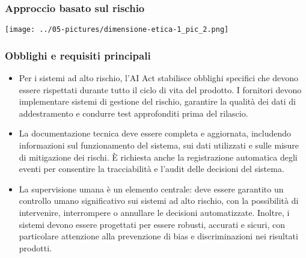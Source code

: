 \documentclass{beamer}
\begin{document}
%
%
\begin{frame}
\frametitle{Approccio basato sul rischio}
\begin{center}
\texttt{[image: ../05-pictures/dimensione-etica-1\_pic\_2.png]} 
\end{center}
\end{frame}
%
%
\begin{frame}
\frametitle{Obblighi e requisiti principali}
\begin{itemize}
\small
\item Per i sistemi ad alto rischio, l'AI Act stabilisce obblighi specifici che devono essere rispettati durante tutto il ciclo di vita del prodotto. I fornitori devono implementare sistemi di gestione del rischio, garantire la qualità dei dati di addestramento e condurre test approfonditi prima del rilascio.

\item La documentazione tecnica deve essere completa e aggiornata, includendo informazioni sul funzionamento del sistema, sui dati utilizzati e sulle misure di mitigazione dei rischi. È richiesta anche la registrazione automatica degli eventi per consentire la tracciabilità e l'audit delle decisioni del sistema.

\item La supervisione umana è un elemento centrale: deve essere garantito un controllo umano significativo sui sistemi ad alto rischio, con la possibilità di intervenire, interrompere o annullare le decisioni automatizzate. Inoltre, i sistemi devono essere progettati per essere robusti, accurati e sicuri, con particolare attenzione alla prevenzione di bias e discriminazioni nei risultati prodotti.
\end{itemize}
\end{frame}
%
%
\end{document}
